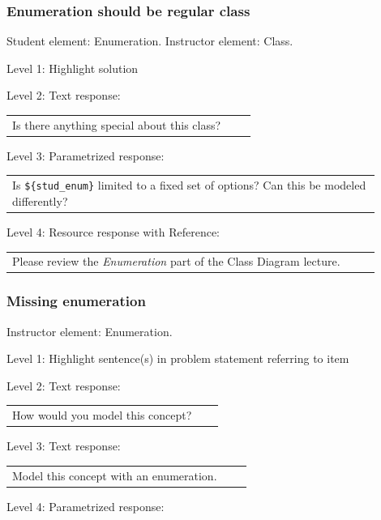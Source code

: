 \subsubsection{Enumeration should be regular class}

Student element: Enumeration. Instructor element: Class. \medskip

\noindent Level 1: Highlight solution  \medskip

\noindent Level 2: Text response: \medskip

\begin{tabular}{|p{0.9\linewidth}}
Is there anything special about this class?
\end{tabular} \medskip

\noindent Level 3: Parametrized response: \medskip

\begin{tabular}{|p{0.9\linewidth}}
Is \verb|${stud_enum}| limited to a fixed set of options? Can this be modeled differently?
\end{tabular} \medskip

\noindent Level 4: Resource response with Reference: \medskip

\begin{tabular}{|p{0.9\linewidth}}
Please review the \textit{Enumeration} part of the Class Diagram lecture.
\end{tabular} \medskip


\subsubsection{Missing enumeration}

Instructor element: Enumeration. \medskip

\noindent Level 1: Highlight sentence(s) in problem statement referring to item \medskip

\noindent Level 2: Text response: \medskip

\begin{tabular}{|p{0.9\linewidth}}
How would you model this concept?
\end{tabular} \medskip

\noindent Level 3: Text response: \medskip

\begin{tabular}{|p{0.9\linewidth}}
Model this concept with an enumeration.
\end{tabular} \medskip

\noindent Level 4: Parametrized response: \medskip

